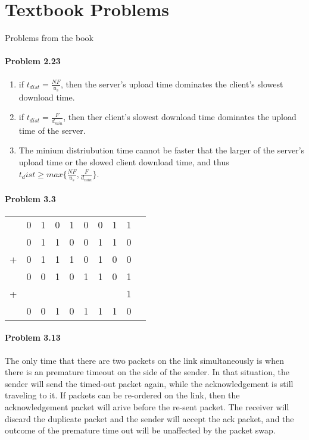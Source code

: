 \documentclass[12pt]{article}
\title{\class{}\assign{}\hwNum{}}
\author{\name{}}
\date{\displaydate{date}}
\begin{document}
\maketitle
\newpage

\section{Textbook Problems}
Problems from the book

\paragraph{Problem 2.23}
\begin{enumerate}[label=\textbf{Part \alph*)}]
	\item if $t_{dist} = \frac{NF}{u_s}$, then the server's upload time dominates the client's slowest download time.
	\item if $t_{dist} = \frac{F}{d_{min}}$, then ther client's slowest download time dominates the upload time of the server.
	\item The minium distriubution time cannot be faster that the larger of the server's upload time or the slowed client download time, and thus $t_dist \geq max\{ \frac{NF}{ u_s}, \frac{F}{ d_{min}} \}$.
\end{enumerate}

\paragraph{Problem 3.3}
\begin{tabular}{c*{9}{@{\,}c}}
	    & 0&1&0&1&0&0&1&1 \\
	    & 0&1&1&0&0&1&1&0 \\
	+ & 0&1&1&1&0&1&0&0 \\
	\hline
	& 0&0&1&0&1&1&0&1\\
	+ &&&&&&&&1\\
	\hline
	&0&0&1&0&1&1&1&0\\
\end{tabular}

\paragraph{Problem 3.13}
The only time that there are two packets on the link simultaneously is when there is an premature timeout on the side of the sender. In that situation, the sender will send the timed-out packet again, while the acknowledgement is still traveling to it. If packets can be re-ordered on the link, then the acknowledgement packet will arive before the re-sent packet. The receiver will discard the duplicate packet and the sender will accept the ack packet, and the outcome of the premature time out will be unaffected by the packet swap.
\end{document}
